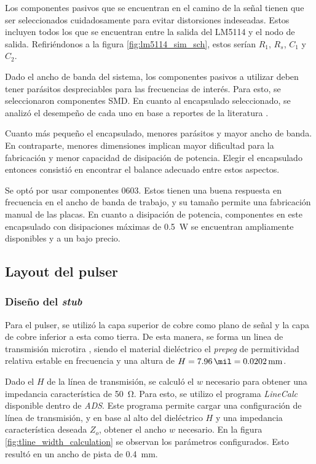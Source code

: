 Los componentes pasivos que se encuentran en el camino de la señal tienen que
ser seleccionados cuidadosamente para evitar distorsiones indeseadas. Estos
incluyen todos los que se encuentran entre la salida del LM5114 y el nodo de
salida. Refiriéndonos a la figura \ref{fig:lm5114_sim_sch}, estos serían $R_1$,
$R_s$, $C_1$ y $C_2$.

Dado el ancho de banda del sistema, los componentes pasivos a utilizar deben
tener parásitos despreciables para las frecuencias de interés. Para esto, se
seleccionaron componentes SMD. En cuanto al encapsulado seleccionado, se analizó
el desempeño de cada uno en base a reportes de la literatura
\cite{vishayFreqResp}.

Cuanto más pequeño el encapsulado, menores parásitos y mayor ancho de banda. En
contraparte, menores dimensiones implican mayor dificultad para la fabricación y
menor capacidad de disipación de potencia. Elegir el encapsulado entonces
consistió en encontrar el balance adecuado entre estos aspectos.

Se optó por usar componentes 0603. Estos tienen una buena respuesta en
frecuencia en el ancho de banda de trabajo, y su tamaño permite una fabricación
manual de las placas. En cuanto a disipación de potencia, componentes en este
encapsulado con disipaciones máximas de \qty{0.5}{\watt} se encuentran
ampliamente disponibles y a un bajo precio.

\subsection{Layout del pulser}

\subsubsection{Diseño del \textit{stub}}

Para el pulser, se utilizó la capa superior de cobre como plano de señal y la
capa de cobre inferior a esta como tierra. De esta manera, se forma un linea de
transmisión microtira \cite{pozar2011}, siendo el material dieléctrico el
\textit{prepeg} de permitividad relativa estable en frecuencia y una altura de
$H = \qty{7.96}{\mil} = \qty{0.0202}{\milli\meter}$.

Dado el $H$ de la línea de transmisión, se calculó el $w$ necesario para obtener
una impedancia característica de \qty{50}{\ohm}. Para esto, se utilizo el
programa \textit{LineCalc} disponible dentro de \textit{ADS}. Este programa
permite cargar una configuración de línea de transmisión, y en base al alto del
dieléctrico $H$ y una impedancia característica deseada $Z_o$, obtener el ancho
$w$ necesario. En la figura \ref{fig:tline_width_calculation} se observan los
parámetros configurados. Esto resultó en un ancho de pista de
\qty{0.4}{\milli\meter}.

